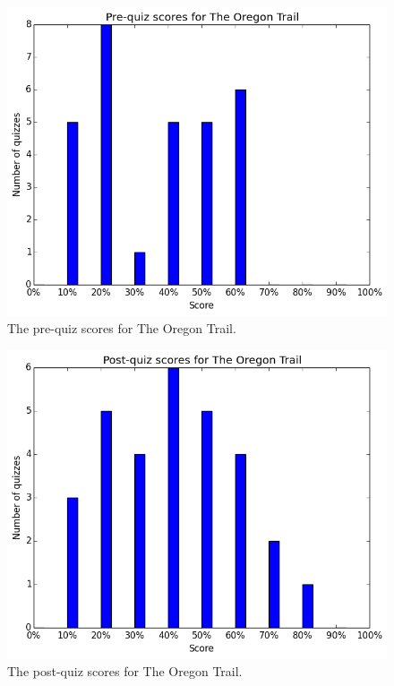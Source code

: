 			\begin{figure}[h!] 
			\centering 
			\includegraphics[height=0.33\textheight]{oregon_pre.png} 
			\caption{The pre-quiz scores for The Oregon Trail.}
			\end{figure}

			\begin{figure}[h!] 
			\centering 
			\includegraphics[height=0.33\textheight]{oregon_post.png} 
			\caption{The post-quiz scores for The Oregon Trail.}
			\end{figure}


\cleardoublepage

